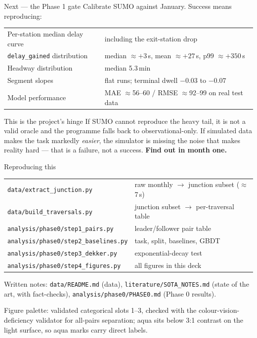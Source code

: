 \documentclass[aspectratio=169,10pt]{beamer}
\newcommand{\srcnote}[1]{{\scriptsize\color{ink3}#1}}
\begin{document}
\begin{frame}{Next --- the Phase 1 gate}
  Calibrate SUMO against January. Success means reproducing:

  \vspace{0.8em}
  \centering
  \begin{tabular}{@{}ll@{}}
    \toprule
    Per-station median delay curve & including the exit-station drop \\
    \texttt{delay\_gained} distribution & median $\approx+3$\,s, mean $\approx+27$\,s,
      p99 $\approx+350$\,s \\
    Headway distribution & median 5.3\,min \\
    Segment slopes & flat runs; terminal dwell $-0.03$ to $-0.07$ \\
    Model performance & MAE $\approx$56--60 / RMSE $\approx$92--99 on real test data \\
    \bottomrule
  \end{tabular}

  \vspace{1.2em}
  \raggedright
  \begin{alertblock}{\small This is the project's hinge}
    \small If SUMO cannot reproduce the heavy tail, it is not a valid oracle and the
    programme falls back to observational-only. If simulated data makes the task markedly
    \emph{easier}, the simulator is missing the noise that makes reality hard --- that is a
    failure, not a success. \textbf{Find out in month one.}
  \end{alertblock}
\end{frame}

\begin{frame}{Reproducing this}
  \small
  \begin{tabular}{@{}ll@{}}
    \toprule
    \texttt{data/extract\_junction.py} & raw monthly $\to$ junction subset ($\approx$7\,s) \\
    \texttt{data/build\_traversals.py} & junction subset $\to$ per-traversal table \\
    \texttt{analysis/phase0/step1\_pairs.py} & leader/follower pair table \\
    \texttt{analysis/phase0/step2\_baselines.py} & task, split, baselines, GBDT \\
    \texttt{analysis/phase0/step3\_dekker.py} & exponential-decay test \\
    \texttt{analysis/phase0/step4\_figures.py} & all figures in this deck \\
    \bottomrule
  \end{tabular}

  \vspace{1.2em}
  Written notes: \texttt{data/README.md} (data),
  \texttt{literature/SOTA\_NOTES.md} (state of the art, with fact-checks),
  \texttt{analysis/phase0/PHASE0.md} (Phase 0 results).

  \vspace{1.2em}
  \srcnote{Figure palette: validated categorical slots 1--3, checked with the
  colour-vision-deficiency validator for all-pairs separation; aqua sits below 3:1 contrast on
  the light surface, so aqua marks carry direct labels.}
\end{frame}
\end{document}
